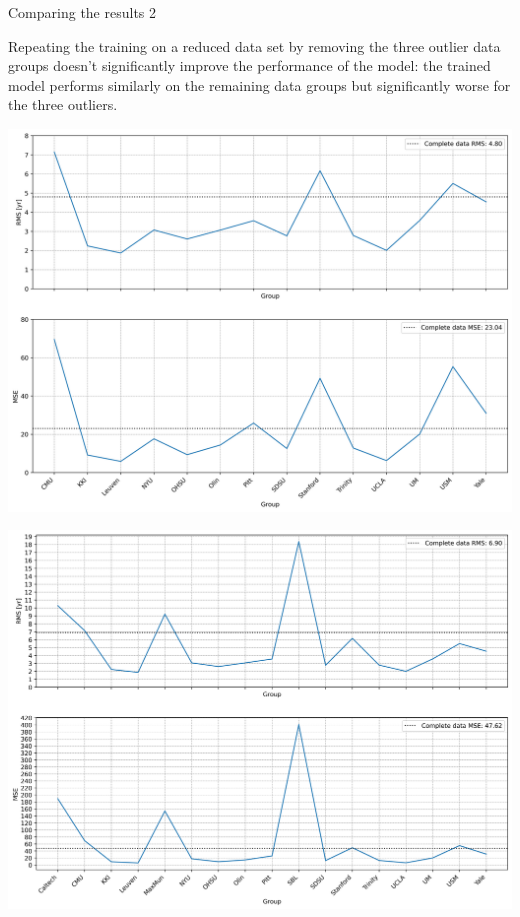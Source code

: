 \documentclass{beamer}
\begin{document}
\begin{frame}{Comparing the results 2}

Repeating the training on a reduced data set by removing the three outlier data groups doesn't significantly improve the performance of the model: the trained model performs similarly on the remaining data groups but significantly worse for the three outliers. 

\begin{table}\centering
\begin{minipage}{0.45\textwidth}
	\includegraphics[width=\textwidth]{result_without_out.png}
\end{minipage}
\begin{minipage}{0.45\textwidth}
	\includegraphics[width=\textwidth]{result_without_out_overall.png}
\end{minipage}
\end{table}

\end{frame}
\end{document}

